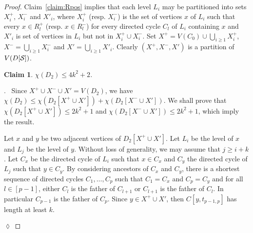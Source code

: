 \documentclass[utf8,10pt]{article}
\theoremstyle{plain}
\newtheorem{lemma}[theorem]{Lemma}
\newtheorem{claim}{Claim}[theorem]
\theoremstyle{definition}
\theoremstyle{remark}
\newenvironment{subproof}{\par\noindent {\it Subproof}.\ }{\hfill$\lozenge$\par\vspace{11pt}}
\begin{document}
\begin{proof}
Claim~\ref{claim:Rpos} implies that each level $L_i$ may be partitioned into sets $X^+_i$, $X^-_i$ and $X'_i$, where
$X^+_i$ (resp.  $X^-_i$) is the set of vertices $x$ of $L_i$ such that every $x\in R^+_l$ (resp. $x\in R^-_l$)
for every directed cycle $C_l$ of $L_i$ containing $x$ and $X'_i$ is set of vertices in $L_i$ but not in $X^+_i\cup X^-_i$. 
Set $X^+=V(C_0) \cup \bigcup_{i\geq 1} X^+_i$, $X^-=\bigcup_{i\geq 1} X^-_i$ and $X'=\bigcup_{i\geq 1} X'_i$.
Clearly $(X^+, X^-, X')$ is a partition of $V(D[{\cal S}])$.


%





\begin{claim}\label{claim:D2}
$\chi(D_2)\leq 4k^2 +2 $.
\end{claim}

\begin{subproof}
Since $X^+\cup X^-\cup X'=V(D_2)$, we have $\chi(D_2) \leq \chi (D_2[X^+\cup X']) + \chi(D_2[X^-\cup X'])$.
We shall prove that $\chi (D_2[X^+\cup X'])\leq 2k^2+1$ and $\chi (D_2[X^-\cup X'])\leq 2k^2+1$, which imply the result.


\medskip

Let $x$ and $y$ be two adjacent vertices of $D_2[X^+\cup X']$. Let $L_i$ be the level of $x$ and $L_j$ be the level of $y$. Without loss of generality, we may assume that $j\geq i+k$.
Let $C_x$ be the directed cycle of $L_i$ such that $x \in C_x$ and $C_y$ the directed cycle of $L_j$ such that $y \in C_y$.
By considering ancestors of $C_x$ and $C_y$, there is a shortest sequence of directed cycles $C_1, \dots , C_p$ such that $C_1 = C_x$ and $C_p = C_y$ and for all $l\in [p-1]$, either $C_l$ is the father of $C_{l+1}$ or $C_{l+1}$ is the father of $C_l$.
In particular $C_{p-1}$ is the father of $C_p$. Since $y\in X^+\cup X'$, then $C[y,t_{p-1,p}]$ has length at least $k$.


\end{subproof}
\end{proof}
\end{document}
